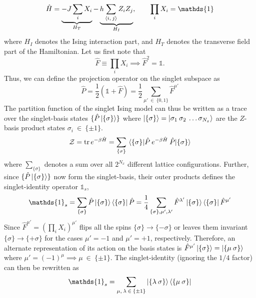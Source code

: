 \documentclass[../thesis_main.tex]{subfiles}
\begin{document}
\begin{equation}
    \hat{H} = \underbrace{-J \sum_i X_i}_{H_T} - \underbrace{h \sum_{\expval{i, \:j}} Z_{i} Z_{j}}_{H_I}, \qquad \prod_i X_i = \mathds{1}
\end{equation} 
where $H_I$ denotes the Ising interaction part, and $H_T$ denotes the transverse field part of the Hamiltonian. Let us first note that
\begin{equation}
    \hat{F} \equiv \prod_i X_i \implies \hat{F}^2 = \mathds{1}.
    \label{flipoperator}
\end{equation}  
Thus, we can define the projection operator on the singlet subspace as
\begin{equation}
    \hat{P} = \frac{1}{2}(\mathds{1} + \hat{F}) = \frac{1}{2} \sum_{\mu' \: \in \: \{0, 1\}} \hat{F}^{\mu'}
\end{equation}
The partition function of the singlet Ising model can thus be written as a trace over the singlet-basis states $\{\hat{P} \ket{\{\sigma\}} \}$ where $\ket{\{\sigma\}} = \ket{\sigma_1 \: \sigma_2 \: \ldots \sigma_{N_x}}$ are the $Z$-basis product states $\sigma_i \: \in \: \{\pm 1\}$.
\begin{equation}
    \mathcal{Z} = \tr e^{-\beta \hat{H}} = \sum_{\{\sigma\}} \mel{\{\sigma\}}{\hat{P} \: e^{-\beta \hat{H}} \: \hat{P}}{\{\sigma\}}
\end{equation}
where $\sum_{\{\sigma\}}$ denotes a sum over all $2^{N_x}$ different lattice configurations. Further, since $\{\hat{P} \ket{\{\sigma\}} \}$ now form the singlet-basis, their outer products defines the singlet-identity operator $\mathds{1}_s$,
\begin{equation}
    \mathds{1}_s = \sum_{\{\sigma\}} \hat{P} \ket{\{\sigma\}} \bra{\{\sigma\}} \hat{P} = \frac{1}{4} \sum_{\{\sigma\}, \mu', \lambda'} \hat{F}^{\lambda'} \ket{\{\sigma\}} \bra{\{\sigma\}} \hat{F}^{\mu'}  
\end{equation}
Since $\hat{F}^{\mu'} = (\prod_i X_i)^{\mu'}$ flips all the spins $\{\sigma\} \longrightarrow \{-\sigma\}$ or leaves them invariant $\{\sigma\} \longrightarrow \{+\sigma\}$ for the cases ${\mu'} = -1$ and ${\mu'} = +1$, respectively. Therefore, an alternate representation of its action on the basis states is $\hat{F}^{\mu'} \ket{\{\sigma\}} = \ket{\{\mu \: \sigma\}}$ where $\mu'= (-1)^{\mu} \implies \mu \: \in \: \{\pm 1\}$. The singlet-identity (ignoring the $1/4$ factor) can then be rewritten as
\begin{equation}
    \mathds{1}_s = \sum_{\mu, \:\lambda \: \in \: \{\pm 1\}} \ket{\{\lambda \: \sigma\}} \bra{\{\mu \: \sigma\}}
\end{equation}
\end{document}
